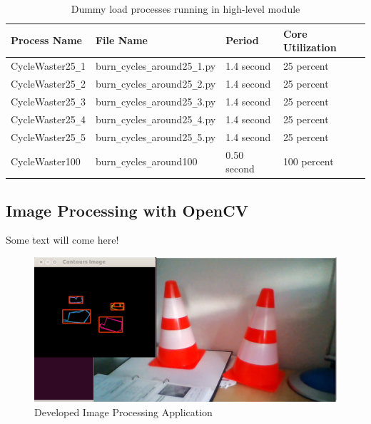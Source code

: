 \begin{itemize}
	\begin{table}[h!]
		\begin{tabular}{|l|l|l|l|}
			\hline
			Process Name & File Name & Period & Core Utilization \\
			\hline
			\hline
			CycleWaster25\texttt{\_}1 & burn\texttt{\_}cycles\texttt{\_}around25\texttt{\_}1.py & 1.4 second & 25 percent \\
			\hline
			CycleWaster25\texttt{\_}2 & burn\texttt{\_}cycles\texttt{\_}around25\texttt{\_}2.py & 1.4 second &  25 percent \\
			\hline
			CycleWaster25\texttt{\_}3 & burn\texttt{\_}cycles\texttt{\_}around25\texttt{\_}3.py & 1.4 second &  25 percent \\
			\hline
			CycleWaster25\texttt{\_}4 & burn\texttt{\_}cycles\texttt{\_}around25\texttt{\_}4.py & 1.4 second &  25 percent \\
			\hline
			CycleWaster25\texttt{\_}5 & burn\texttt{\_}cycles\texttt{\_}around25\texttt{\_}5.py & 1.4 second &  25 percent \\
			\hline
			CycleWaster100 & burn\texttt{\_}cycles\texttt{\_}around100 & 0.50 second & 100 percent \\
			\hline
		\end{tabular}
		\caption{Dummy load processes running in high-level module}
		\label{tbl_dummyloads}
	\end{table}
	
\end{itemize}

\subsection{Image Processing with OpenCV}
Some text will come here! \\
\begin{figure}[!ht]
	\includegraphics[scale=0.15]{content/images/traffic_cone_detection.png}
	\caption{Developed Image Processing Application}
	\label{fig:traffic_cone_detection}
\end{figure}
